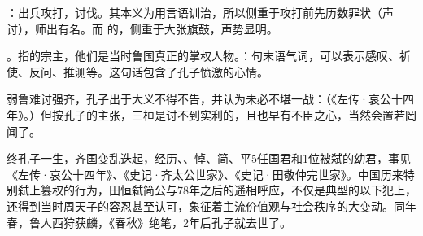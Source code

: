 {%

\item {}：出兵攻打，讨伐。其本义为用言语训治，所以侧重于攻打前先历数罪状（声讨），师出有名。而  的，侧重于大张旗鼓，声势显明。

\item {}。指的宗主，他们是当时鲁国真正的掌权人物。：句末语气词，可以表示感叹、祈使、反问、推测等。这句话包含了孔子愤激的心情。

弱鲁难讨强齐，孔子出于大义不得不告，并认为未必不堪一战：（《左传·哀公十四年》。）但按孔子的主张，三桓是讨不到实利的，且也早有不臣之心，当然会置若罔闻了。

终孔子一生，齐国变乱迭起，经历、、悼、简、平5任国君和1位被弑的幼君，事见《左传·哀公十四年》、《史记·齐太公世家》、《史记·田敬仲完世家》。中国历来特别弑上篡权的行为，田恒弑简公与78年之后的遥相呼应，不仅是典型的以下犯上，还得到当时周天子的容忍甚至认可，象征着主流价值观与社会秩序的大变动。同年春，鲁人西狩获麟，《春秋》绝笔，2年后孔子就去世了。
}
{}


